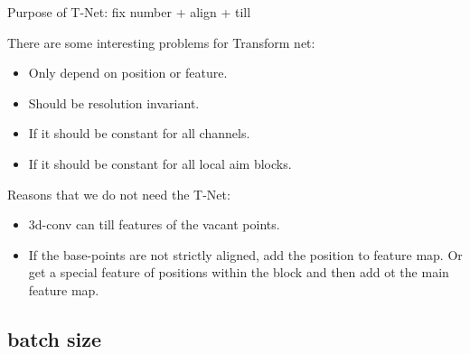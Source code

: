 \documentclass{article}
\begin{document}
Purpose of T-Net: fix number + align + till \par
There are some interesting problems for Transform net:
\begin{itemize}
	\item Only depend on position or feature.
	\item Should be resolution invariant.
	\item If it should be constant for all channels.
	\item If it should be constant for all local aim blocks.
\end{itemize}
\par
Reasons that we do not need the T-Net:
\begin{itemize}
	\item 3d-conv can till features of the vacant points.
	\item If the base-points are not strictly aligned, add the position to feature map. Or get a special feature of positions within the block and then add ot the main feature map.
\end{itemize}
\par
{}


\subsection{batch size}
\end{document}
